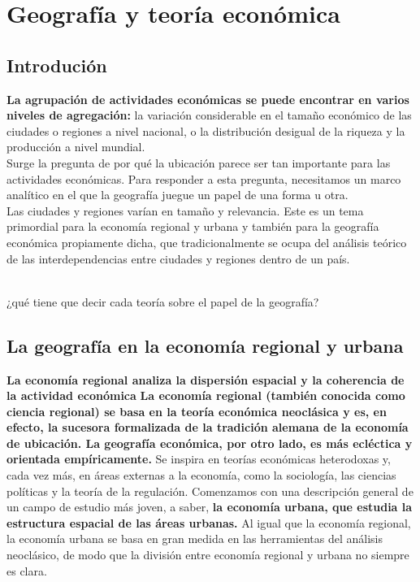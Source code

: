 \chapter{Geografía y teoría económica}

\section{Introdución}

\textbf{La agrupación de actividades económicas se puede encontrar en varios niveles de agregación:} la variación considerable en el tamaño económico de las ciudades o regiones a nivel nacional, o la distribución desigual de la riqueza y la producción a nivel mundial.\\
Surge la pregunta de por qué la ubicación parece ser tan importante para las actividades económicas. Para responder a esta pregunta, necesitamos un marco analítico en el que la geografía juegue un papel de una forma u otra.\\
Las ciudades y regiones varían en tamaño y relevancia. Este es un tema primordial para la economía regional y urbana y también para la geografía económica propiamente dicha, que tradicionalmente se ocupa del análisis teórico de las interdependencias entre ciudades y regiones dentro de un país.\\\\
\begin{center}
    ¿qué tiene que decir cada teoría sobre el papel de la geografía?
\end{center}

\section{La geografía en la economía regional y urbana}
\textbf{La economía regional analiza la dispersión espacial y la coherencia de la actividad económica}
\textbf{La economía regional (también conocida como ciencia regional) se basa en la teoría económica neoclásica y es, en efecto, la sucesora formalizada de la tradición alemana de la economía de ubicación. La geografía económica, por otro lado, es más ecléctica y orientada empíricamente.} Se inspira en teorías económicas heterodoxas y, cada vez más, en áreas externas a la economía, como la sociología, las ciencias políticas y la teoría de la regulación. Comenzamos con una descripción general de un campo de estudio más joven, a saber, \textbf{la economía urbana, que estudia la estructura espacial de las áreas urbanas.} Al igual que la economía regional, la economía urbana se basa en gran medida en las herramientas del análisis neoclásico, de modo que la división entre economía regional y urbana no siempre es clara. 

